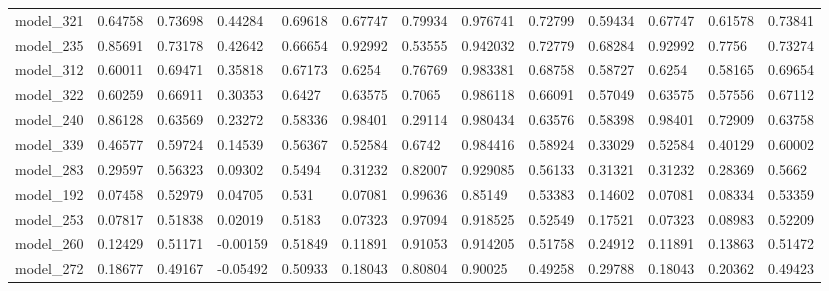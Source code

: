 \begin{tabular}{lllllllllllll}
model\_321     & 0.64758     & 0.73698        & 0.44284      & 0.69618          & 0.67747              & 0.79934              & 0.976741     & 0.72799           & 0.59434            & 0.67747         & 0.61578     & 0.73841      \\
model\_235     & 0.85691     & 0.73178        & 0.42642      & 0.66654          & 0.92992              & 0.53555              & 0.942032     & 0.72779           & 0.68284            & 0.92992         & 0.7756      & 0.73274      \\
model\_312     & 0.60011     & 0.69471        & 0.35818      & 0.67173          & 0.6254               & 0.76769              & 0.983381     & 0.68758           & 0.58727            & 0.6254          & 0.58165     & 0.69654      \\
model\_322     & 0.60259     & 0.66911        & 0.30353      & 0.6427           & 0.63575              & 0.7065               & 0.986118     & 0.66091           & 0.57049            & 0.63575         & 0.57556     & 0.67112      \\
model\_240     & 0.86128     & 0.63569        & 0.23272      & 0.58336          & 0.98401              & 0.29114              & 0.980434     & 0.63576           & 0.58398            & 0.98401         & 0.72909     & 0.63758      \\
model\_339     & 0.46577     & 0.59724        & 0.14539      & 0.56367          & 0.52584              & 0.6742               & 0.984416     & 0.58924           & 0.33029            & 0.52584         & 0.40129     & 0.60002      \\
model\_283     & 0.29597     & 0.56323        & 0.09302      & 0.5494           & 0.31232              & 0.82007              & 0.929085     & 0.56133           & 0.31321            & 0.31232         & 0.28369     & 0.5662       \\
model\_192     & 0.07458     & 0.52979        & 0.04705      & 0.531            & 0.07081              & 0.99636              & 0.85149      & 0.53383           & 0.14602            & 0.07081         & 0.08334     & 0.53359      \\
model\_253     & 0.07817     & 0.51838        & 0.02019      & 0.5183           & 0.07323              & 0.97094              & 0.918525     & 0.52549           & 0.17521            & 0.07323         & 0.08983     & 0.52209      \\
model\_260     & 0.12429     & 0.51171        & -0.00159     & 0.51849          & 0.11891              & 0.91053              & 0.914205     & 0.51758           & 0.24912            & 0.11891         & 0.13863     & 0.51472      \\
model\_272     & 0.18677     & 0.49167        & -0.05492     & 0.50933          & 0.18043              & 0.80804              & 0.90025      & 0.49258           & 0.29788            & 0.18043         & 0.20362     & 0.49423
\end{tabular}